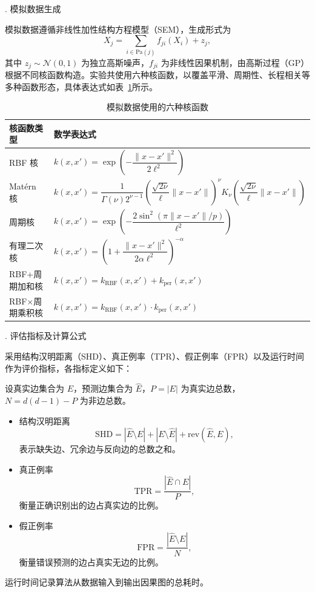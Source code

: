 {. 模拟数据生成}

模拟数据遵循非线性加性结构方程模型（SEM），生成形式为
\[
X_j = \sum_{i \in \mathrm{Pa}(j)} f_{ji}(X_i) + z_j,
\]
其中 \(z_j \sim \mathcal{N}(0,1)\) 为独立高斯噪声，\(f_{ji}\) 为非线性因果机制，由高斯过程（GP）根据不同核函数构造。实验共使用六种核函数，以覆盖平滑、周期性、长程相关等多种函数形态，具体表达式如表~\ref{tab:kernels}所示。

\begin{table}[htbp]
	\centering
	\caption{模拟数据使用的六种核函数}
	\label{tab:kernels}
	\setlength{\tabcolsep}{3pt}
	\begin{tabular}{ll}
		\toprule
		核函数类型 & 数学表达式 \\
		\midrule
		RBF 核 & $k(x,x') = \exp\left(-\dfrac{\|x-x'\|^2}{2\ell^2}\right)$ \\
		Matérn 核 & $k(x,x') = \dfrac{1}{\Gamma(\nu)2^{\nu-1}}\left(\dfrac{\sqrt{2\nu}}{\ell}\|x-x'\|\right)^\nu K_\nu\!\left(\dfrac{\sqrt{2\nu}}{\ell}\|x-x'\|\right)$ \\
		周期核 & $k(x,x') = \exp\left(-\dfrac{2\sin^2(\pi\|x-x'\|/p)}{\ell^2}\right)$ \\
		有理二次核 & $k(x,x') = \left(1+\dfrac{\|x-x'\|^2}{2\alpha\ell^2}\right)^{-\alpha}$ \\
		RBF+周期加和核 & $k(x,x') = k_\mathrm{RBF}(x,x') + k_\mathrm{per}(x,x')$ \\
		RBF×周期乘积核 & $k(x,x') = k_\mathrm{RBF}(x,x') \cdot k_\mathrm{per}(x,x')$ \\
		\bottomrule
	\end{tabular}
\end{table}

{. 评估指标及计算公式}

采用结构汉明距离（SHD）、真正例率（TPR）、假正例率（FPR）以及运行时间作为评价指标，各指标定义如下：

设真实边集合为 \(E\)，预测边集合为 \(\hat{E}\)，\(P=|E|\) 为真实边总数，\(N=d(d-1)-P\) 为非边总数。
\begin{itemize}
	\item 结构汉明距离
	\[
	\mathrm{SHD} = |\hat{E} \setminus E| + |E \setminus \hat{E}| + \mathrm{rev}(\hat{E},E),
	\]
	表示缺失边、冗余边与反向边的总数之和。
	\item 真正例率
	\[
	\mathrm{TPR} = \frac{|\hat{E} \cap E|}{P},
	\]
	衡量正确识别出的边占真实边的比例。
	\item 假正例率
	\[
	\mathrm{FPR} = \frac{|\hat{E} \setminus E|}{N},
	\]
	衡量错误预测的边占真实无边的比例。
\end{itemize}
运行时间记录算法从数据输入到输出因果图的总耗时。

